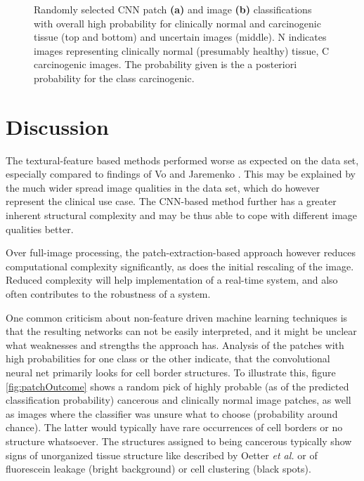 \documentclass[fleqn,10pt]{wlscirep}
\begin{document}
\begin{figure}[!t]
\centering
{}
\caption{
Randomly selected CNN patch \textbf{(a)} and image \textbf{(b)} classifications with overall high probability for clinically normal and carcinogenic tissue (top and bottom) and
uncertain images (middle). N indicates images representing clinically normal (presumably healthy) tissue, C carcinogenic
  images. The probability given is the a posteriori probability for
  the class carcinogenic.
}


\end{figure}







\section{Discussion}

The textural-feature based methods performed worse as expected on the data set, especially compared to findings of Vo \cite{Vo:2016} and Jaremenko \cite{Jaremenko:2015kh}. This may be explained by the much wider spread image qualities in the data set, which do however represent the clinical use case. The CNN-based method further has a greater inherent structural complexity and may be thus able to cope with different image qualities better.

Over full-image processing, the patch-extraction-based approach however reduces computational complexity significantly, as does the initial rescaling of the image. Reduced complexity will help implementation of a real-time system, and also often contributes to the robustness of a system.

One common criticism about non-feature driven machine learning techniques is that the resulting networks can not be easily interpreted, and it might be unclear what weaknesses and strengths the approach has. Analysis of the patches with high probabilities for one class or the other indicate, that the convolutional neural net primarily looks for cell border structures. To illustrate this, figure \ref{fig:patchOutcome} shows a random pick of highly probable (as of the predicted classification probability) cancerous and clinically normal image patches, as well as images where the classifier was unsure what to choose (probability around chance). The latter would typically have rare occurrences of cell borders or no structure whatsoever. The structures assigned to being cancerous typically show signs of unorganized tissue structure like described by Oetter \textit{et al.}\cite{Oetter:2016cp} or of fluorescein leakage (bright background) or cell clustering (black spots).
\end{document}
